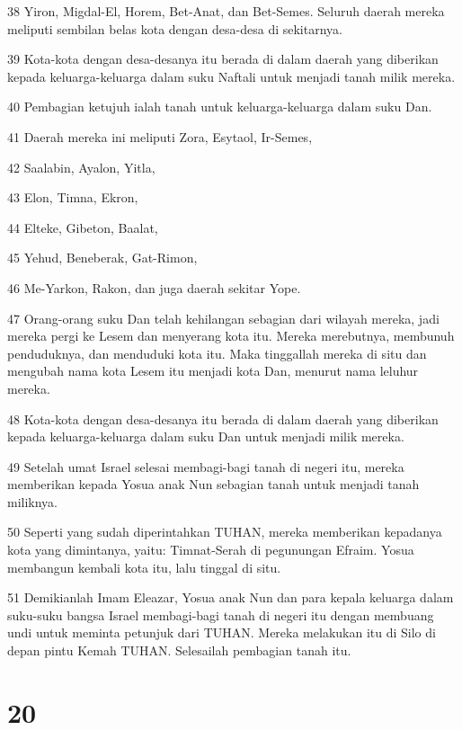 \par 38 Yiron, Migdal-El, Horem, Bet-Anat, dan Bet-Semes. Seluruh daerah mereka meliputi sembilan belas kota dengan desa-desa di sekitarnya.
\par 39 Kota-kota dengan desa-desanya itu berada di dalam daerah yang diberikan kepada keluarga-keluarga dalam suku Naftali untuk menjadi tanah milik mereka.
\par 40 Pembagian ketujuh ialah tanah untuk keluarga-keluarga dalam suku Dan.
\par 41 Daerah mereka ini meliputi Zora, Esytaol, Ir-Semes,
\par 42 Saalabin, Ayalon, Yitla,
\par 43 Elon, Timna, Ekron,
\par 44 Elteke, Gibeton, Baalat,
\par 45 Yehud, Beneberak, Gat-Rimon,
\par 46 Me-Yarkon, Rakon, dan juga daerah sekitar Yope.
\par 47 Orang-orang suku Dan telah kehilangan sebagian dari wilayah mereka, jadi mereka pergi ke Lesem dan menyerang kota itu. Mereka merebutnya, membunuh penduduknya, dan menduduki kota itu. Maka tinggallah mereka di situ dan mengubah nama kota Lesem itu menjadi kota Dan, menurut nama leluhur mereka.
\par 48 Kota-kota dengan desa-desanya itu berada di dalam daerah yang diberikan kepada keluarga-keluarga dalam suku Dan untuk menjadi milik mereka.
\par 49 Setelah umat Israel selesai membagi-bagi tanah di negeri itu, mereka memberikan kepada Yosua anak Nun sebagian tanah untuk menjadi tanah miliknya.
\par 50 Seperti yang sudah diperintahkan TUHAN, mereka memberikan kepadanya kota yang dimintanya, yaitu: Timnat-Serah di pegunungan Efraim. Yosua membangun kembali kota itu, lalu tinggal di situ.
\par 51 Demikianlah Imam Eleazar, Yosua anak Nun dan para kepala keluarga dalam suku-suku bangsa Israel membagi-bagi tanah di negeri itu dengan membuang undi untuk meminta petunjuk dari TUHAN. Mereka melakukan itu di Silo di depan pintu Kemah TUHAN. Selesailah pembagian tanah itu.

\chapter{20}


